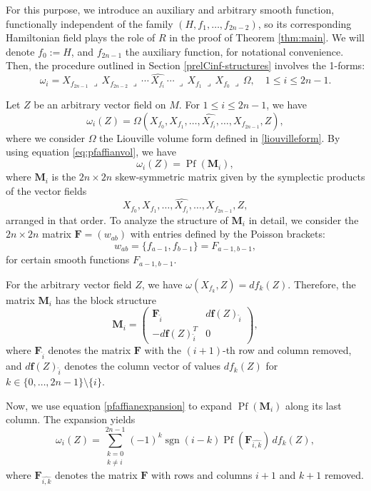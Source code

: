 \documentclass{article}
\theoremstyle{remark}
\theoremstyle{definition}
\newcommand{\contract}{\,\lrcorner\,}
\begin{document}
For this purpose, we introduce an auxiliary and arbitrary smooth function, functionally independent of the family $(H, f_1, \dots, f_{2n-2})$, so its corresponding Hamiltonian field plays the role of $R$ in the proof of Theorem \ref{thm:main}. We will denote $f_0:=H$, and $f_{2n-1}$ the auxiliary function, for notational convenience.
Then, the procedure outlined in Section \ref{prelCinf-structures} involves the 1-forms:
\begin{equation}\label{originalforms}
    \omega_i = X_{f_{2n-1}} \contract X_{f_{2n-2}} \contract \cdots \, \widehat{X_{f_i}} \, \cdots \contract X_{f_{1}} \contract X_{f_0} \contract \Omega, \quad 1\leq i \leq 2n-1.
\end{equation}

Let $Z$ be an arbitrary vector field on $M$. For $1\leq i \leq 2n-1$, we have
$$
\omega_i(Z) = \Omega(X_{f_0}, X_{f_1}, \ldots,\widehat{X_{f_i}},\ldots, X_{f_{2n-1}}, Z),
$$
where we consider $\Omega$ the Liouville volume form defined in \eqref{liouvilleform}. By using equation \eqref{eq:pfaffianvol}, we have
$$
\omega_i(Z)=\operatorname{Pf}(\mathbf{M}_i),
$$
where $\mathbf{M}_i$ is the $2n \times 2n$ skew-symmetric matrix given by the symplectic products of the vector fields 
$$
X_{f_0}, X_{f_1}, \ldots, \widehat{X_{f_i}}, \ldots, X_{f_{2n-1}}, Z,
$$
arranged in that order. To analyze the structure of $\mathbf{M}_i$ in detail, we consider the $2n\times 2n$ matrix $\mathbf{F} = (w_{ab})$ with entries defined by the Poisson brackets:
$$
w_{ab} = \{f_{a-1}, f_{b-1}\}=F_{a-1,b-1},
$$
for certain smooth functions $F_{a-1,b-1}$.

For the arbitrary vector field $Z$, we have $\omega(X_{f_k}, Z) = df_k(Z)$. Therefore, the matrix $\mathbf{M}_i$ has the block structure
$$
\mathbf{M}_i = 
\left(
\begin{array}{c|c}
\mathbf{F}_{\widehat{i}} & d\mathbf{f}(Z)_{\widehat{i}} \\
\hline
-d\mathbf{f}(Z)_{\widehat{i}}^T & 0
\end{array}
\right),
$$
where $\mathbf{F}_{\widehat{i}}$ denotes the matrix $\mathbf{F}$ with the $(i+1)$-th row and column removed, and $d\mathbf{f}(Z)_{\widehat{i}}$ denotes the column vector of values $df_k(Z)$ for $k \in \{0,\dots,2n-1\}\setminus\{i\}$.

Now, we use equation \eqref{pfaffianexpansion} to expand $\operatorname{Pf}(\mathbf{M}_i)$ along its last column. The expansion yields
\begin{equation}
    \omega_i(Z) = \sum_{\substack{k=0 \\ k \neq i}}^{2n-1} (-1)^{k} \operatorname{sgn}(i-k) \operatorname{Pf}(\mathbf{F}_{\widehat{i,k}}) \, df_k(Z),
\end{equation}
where $\mathbf{F}_{\widehat{i,k}}$ denotes the matrix $\mathbf{F}$ with rows and columns $i+1$ and $k+1$ removed.
\end{document}
